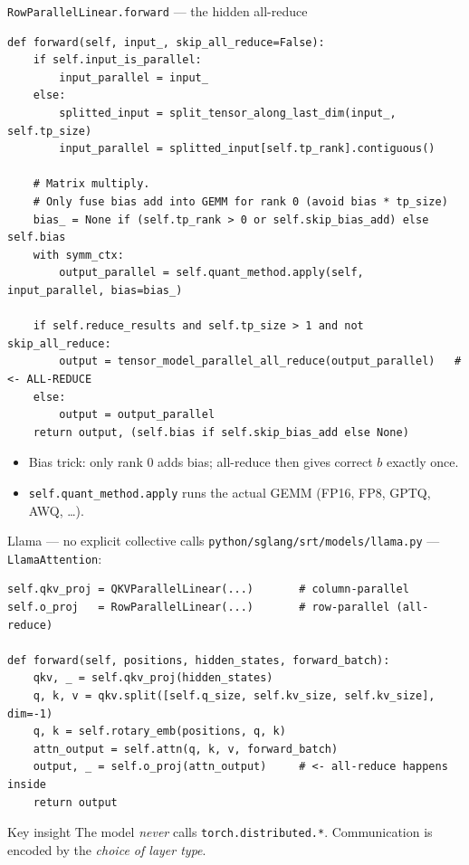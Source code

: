 \documentclass[aspectratio=169,10pt]{beamer}
\begin{document}
\begin{frame}[fragile]{\texttt{RowParallelLinear.forward} --- the hidden all-reduce}
  \footnotesize
\begin{lstlisting}
def forward(self, input_, skip_all_reduce=False):
    if self.input_is_parallel:
        input_parallel = input_
    else:
        splitted_input = split_tensor_along_last_dim(input_, self.tp_size)
        input_parallel = splitted_input[self.tp_rank].contiguous()

    # Matrix multiply.
    # Only fuse bias add into GEMM for rank 0 (avoid bias * tp_size)
    bias_ = None if (self.tp_rank > 0 or self.skip_bias_add) else self.bias
    with symm_ctx:
        output_parallel = self.quant_method.apply(self, input_parallel, bias=bias_)

    if self.reduce_results and self.tp_size > 1 and not skip_all_reduce:
        output = tensor_model_parallel_all_reduce(output_parallel)   # <- ALL-REDUCE
    else:
        output = output_parallel
    return output, (self.bias if self.skip_bias_add else None)
\end{lstlisting}
  \begin{itemize}\scriptsize
    \item Bias trick: only rank 0 adds bias; all-reduce then gives correct $b$ exactly once.
    \item \texttt{self.quant\_method.apply} runs the actual GEMM (FP16, FP8, GPTQ, AWQ, \dots).
  \end{itemize}
\end{frame}

\begin{frame}[fragile]{Llama --- no explicit collective calls}
  \footnotesize
  \texttt{python/sglang/srt/models/llama.py} --- \texttt{LlamaAttention}:
\begin{lstlisting}
self.qkv_proj = QKVParallelLinear(...)       # column-parallel
self.o_proj   = RowParallelLinear(...)       # row-parallel (all-reduce)

def forward(self, positions, hidden_states, forward_batch):
    qkv, _ = self.qkv_proj(hidden_states)
    q, k, v = qkv.split([self.q_size, self.kv_size, self.kv_size], dim=-1)
    q, k = self.rotary_emb(positions, q, k)
    attn_output = self.attn(q, k, v, forward_batch)
    output, _ = self.o_proj(attn_output)     # <- all-reduce happens inside
    return output
\end{lstlisting}
  \begin{block}{Key insight}
    \small
    The model \emph{never} calls \texttt{torch.distributed.*}. Communication is encoded by the
    \emph{choice of layer type}.
  \end{block}
\end{frame}
\end{document}
